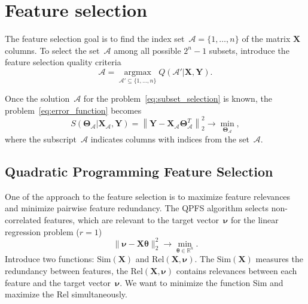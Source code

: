 \documentclass[12pt,twoside]{article}
\newcommand{\bY}{\mathbf{Y}}
\newcommand{\bX}{\mathbf{X}}
\newcommand{\bbR}{\mathbb{R}}
\newcommand{\cA}{\mathcal{A}}
\newcommand{\bnu}{\boldsymbol{\nu}}
\newcommand{\btheta}{\boldsymbol{\theta}}
\newcommand{\bTheta}{\boldsymbol{\Theta}}
\newcommand{\argmax}{\mathop{\arg \max}\limits}
\begin{document}
 \section{Feature selection}
 The feature selection goal is to find the index set~$\cA = \{1, \dots, n\}$ of the matrix $\bX$ columns. To select the set~$\cA$ among all possible $2^n - 1$ subsets, introduce the feature selection quality criteria
\begin{equation}
	\cA = \argmax_{\cA' \subseteq \{1, \dots, n\}} Q(\cA' | \bX, \bY).
	\label{eq:subset_selection}
\end{equation}

Once the solution~$\cA$ for the problem~\eqref{eq:subset_selection} is known, the problem~\eqref{eq:error_function} becomes
\begin{equation}
S(\bTheta_{\cA} | \bX_{\cA}, \bY) = {\left\| \mathbf{Y} - \bX_{\cA}\bTheta^T_{\cA} \right\| }_2^2 \rightarrow\min_{\bTheta_{\cA}},
\end{equation}
where the subscript~$\cA$ indicates columns with indices from the set~$\cA$.

\subsection{Quadratic Programming Feature Selection}
One of the approach to the feature selection is to maximize feature relevances and minimize pairwise feature redundancy.
The QPFS algorithm selects non-correlated features, which are relevant to the target vector~$\bnu$ for the linear regression problem ($r=1$)
\begin{equation*}
	\| \bnu - \bX \btheta\|_2^2 \rightarrow\min_{\btheta \in \bbR^{n}}.
\end{equation*}
Introduce two functions: $\text{Sim}(\bX)$ and $\text{Rel}(\bX, \bnu)$. 
The $\text{Sim}(\bX)$ measures the redundancy between features, the $\text{Rel}(\bX, \bnu)$ contains relevances between each feature and the target vector~$\bnu$. 
We want to minimize the function Sim and maximize the Rel simultaneously.
\end{document}
